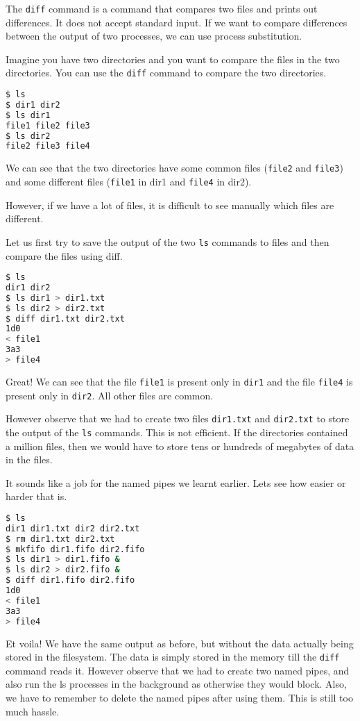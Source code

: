 The \texttt{diff} command is a command that compares two files
and prints out differences. It does not accept standard input.
If we want to compare differences between the output of two
processes, we can use process substitution.

Imagine you have two directories and you want to compare the
files in the two directories. You can use the \texttt{diff}
command to compare the two directories.

\begin{lstlisting}[language=bash]
$ ls
$ dir1 dir2
$ ls dir1
file1 file2 file3
$ ls dir2
file2 file3 file4
\end{lstlisting}

We can see that the two directories have some common files
(\texttt{file2} and \texttt{file3}) and some different files
(\texttt{file1} in dir1 and \texttt{file4} in dir2).

However, if we have a lot of files, it is difficult to see
manually which files are different.

Let us first try to save the output of the two \texttt{ls}
commands to files and then compare the files using diff.

\begin{lstlisting}[language=bash]
$ ls
dir1 dir2
$ ls dir1 > dir1.txt
$ ls dir2 > dir2.txt
$ diff dir1.txt dir2.txt
1d0
< file1
3a3
> file4
\end{lstlisting}

Great! We can see that the file \texttt{file1} is present only
in \texttt{dir1} and the file \texttt{file4} is present only
in \texttt{dir2}. All other files are common.

However observe that we had to create two files \texttt{dir1.txt}
and \texttt{dir2.txt} to store the output of the \texttt{ls}
commands. This is not efficient. If the directories contained
a million files, then we would have to store tens or
hundreds of megabytes of data in the files.

It sounds like a job for the named pipes we learnt earlier.
Lets see how easier or harder that is.

\begin{lstlisting}[language=bash]
$ ls
dir1 dir1.txt dir2 dir2.txt
$ rm dir1.txt dir2.txt
$ mkfifo dir1.fifo dir2.fifo
$ ls dir1 > dir1.fifo &
$ ls dir2 > dir2.fifo &
$ diff dir1.fifo dir2.fifo
1d0
< file1
3a3
> file4
\end{lstlisting}

Et voila! We have the same output as before, but without the
data actually being stored in the filesystem. The data is
simply stored in the memory till the \texttt{diff} command
reads it. However observe that we had to create two named
pipes, and also run the ls processes in the background as
otherwise they would block.
Also, we have to remember to delete the named pipes after
using them.
This is still too much hassle.

